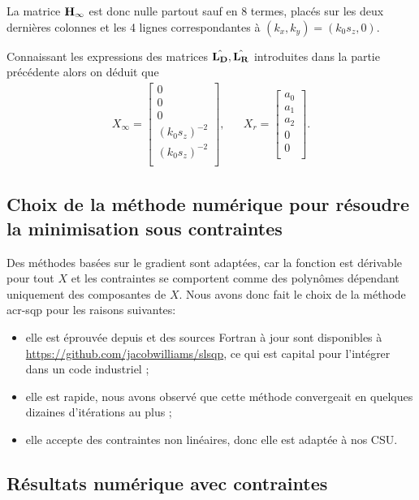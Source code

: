 La matrice \({\mathbf{H}}_\infty\) est donc nulle partout sauf en 8 termes, placés sur les deux dernières colonnes et les 4 lignes correspondantes à \((k_x,k_y)=(k_0 s_z,0)\).

Connaissant les expressions des matrices \(\hat{\mathbf{L_D}},\hat{\mathbf{L_R}}\) introduites dans la partie précédente alors on déduit que
\begin{align*}
  X_\infty = \begin{bmatrix}
    0\\
    0\\
    0\\
    (k_0 s_z)^{-2}\\
    (k_0 s_z)^{-2}\\
  \end{bmatrix},
  & &
  X_r = \begin{bmatrix}
  a_0\\
  a_1\\
  a_2\\
  0\\
  0\\
  \end{bmatrix}.
\end{align*}

\subsection{Choix de la méthode numérique pour résoudre la minimisation sous contraintes}

  Des méthodes basées sur le gradient sont adaptées, car la fonction est dérivable pour tout \(X\) et les contraintes se comportent comme des polynômes dépendant uniquement des composantes de \(X\).
  Nous avons donc fait le choix de la méthode \gls{acr-sqp} pour les raisons suivantes:
 
  \begin{itemize}
    \item elle est éprouvée depuis \cite{kraft_software_1988} et des sources Fortran à jour sont disponibles à \url{https://github.com/jacobwilliams/slsqp}, ce qui est capital pour l'intégrer dans un code industriel ;
    \item elle est rapide, nous avons observé que cette méthode convergeait en quelques dizaines d'itérations au plus ;
    \item elle accepte des contraintes non linéaires, donc elle est adaptée à nos CSU.
  \end{itemize}

  \subsection{Résultats numérique avec contraintes}


